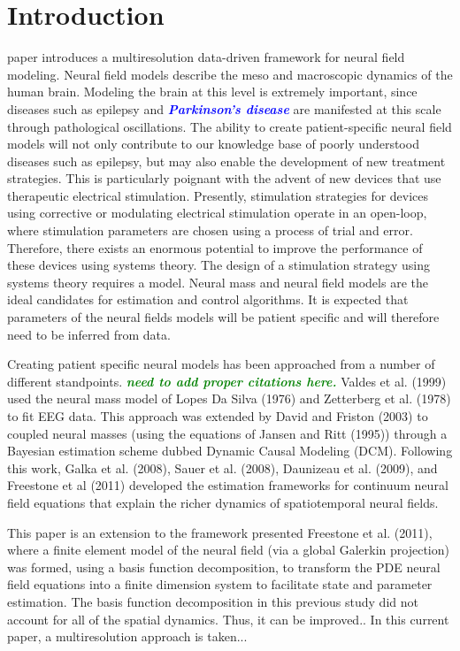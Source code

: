 \documentclass[journal,a4paper]{IEEEtran}
\newcommand{\dean}[1]{\textsf{\emph{\textbf{\textcolor{green}{#1}}}}}
\newcommand{\parham}[1]{\textsf{\emph{\textbf{\textcolor{blue}{#1}}}}}
\begin{document}
\section{Introduction}
 paper introduces a multiresolution data-driven framework for neural field modeling. Neural field models describe the meso and macroscopic dynamics of the human brain. Modeling the brain at this level is extremely important, since diseases such as epilepsy and \parham{Parkinson's disease} are manifested at this scale through pathological oscillations. The ability to create patient-specific neural field models will not only contribute to our knowledge base of poorly understood diseases such as epilepsy, but may also enable the development of new treatment strategies. This is particularly poignant with the advent of new devices that use therapeutic electrical stimulation. Presently, stimulation strategies for devices using corrective or modulating electrical stimulation operate in an open-loop, where stimulation parameters are chosen using a process of trial and error. Therefore, there exists an enormous potential to improve the performance of these devices using systems theory. The design of a stimulation strategy using systems theory requires a model. Neural mass and neural field models are the ideal candidates for estimation and control algorithms. It is expected that parameters of the neural fields models will be patient specific and will therefore need to be inferred from data.

Creating patient specific neural models has been approached from a number of different standpoints. \dean{need to add proper citations here.} Valdes et al. (1999) used the neural mass model of Lopes Da Silva (1976) and Zetterberg et al. (1978) to fit EEG data. This approach was extended by David and Friston (2003) to coupled neural masses (using the equations of Jansen and Ritt (1995)) through a Bayesian estimation scheme dubbed Dynamic Causal Modeling (DCM). Following this work, Galka et al. (2008), Sauer et al. (2008), Daunizeau et al. (2009), and Freestone et al (2011) developed the estimation frameworks for continuum neural field equations that explain the richer dynamics of spatiotemporal neural fields.  

This paper is an extension to the framework presented Freestone et al. (2011), where a finite element model of the neural field (via a global Galerkin projection) was formed, using a basis function decomposition, to transform the PDE neural field equations into a finite dimension system to facilitate state and parameter estimation. The basis function decomposition in this previous study did not account for all of the spatial dynamics. Thus, it can be improved.. In this current paper, a multiresolution approach is taken...
\end{document}
